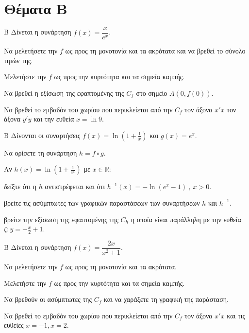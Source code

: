 \section{Θέματα Β}
\def\xrwma{secondcolor}
\begin{thema}{Β}
Δίνεται η συνάρτηση $f(x)=\dfrac{x}{e^x}$.
\begin{erwthma}
\item Να μελετήσετε την $f$ ως προς τη μονοτονία και τα ακρότατα και να βρεθεί το σύνολο τιμών της.
\item Μελετήστε την $f$ ως προς την κυρτότητα και τα σημεία καμπής.
\item Να βρεθεί η εξίσωση της εφαπτομένης της $C_f$ στο σημείο $A(0,f(0))$.
\item Να βρεθεί το εμβαδόν του χωρίου που περικλείεται από την $C_f$ τον άξονα $x'x$ τον άξονα $y'y$ και την ευθεία $x=\ln{9}$.
\end{erwthma}
\end{thema}
\begin{thema}{Β}
Δίνονται οι συναρτήσεις $f(x)=\ln{\left(1+\frac{1}{x}\right)}$ και $g(x)=e^x$.
\begin{erwthma}
\item Να ορίσετε τη συνάρτηση $h=f\circ g$.
\end{erwthma}
Αν $h(x)=\ln\left(1+\frac{1}{e^x}\right)$ με $x\in\mathbb{R}$:
\begin{erwthma}[resume]
\item δείξτε ότι η $h$ αντιστρέφεται και ότι $h^{-1}(x)=-\ln{\left(e^x-1\right)}\ ,\ x>0$.
\item βρείτε τις ασύμπτωτες των γραφικών παραστάσεων των συναρτήσεων $h$ και $h^{-1}$.
\item βρείτε την εξίσωση της εφαπτομένης της $C_h$ η οποία είναι παράλληλη με την ευθεία $\zeta: y=-\frac{x}{2}+1$.
\end{erwthma}
\end{thema}
\begin{thema}{Β}
Δίνεται η συνάρτηση $f(x)=\dfrac{2x}{x^2+1}$.
\begin{erwthma}
\item Να μελετήσετε την $f$ ως προς τη μονοτονία και τα ακρότατα.
\item Μελετήστε την $f$ ως προς την κυρτότητα και τα σημεία καμπής.
\item Να βρεθούν οι ασύμπτωτες της $C_f$ και να χαράξετε τη γραφική της παράσταση.
\item Να βρεθεί το εμβαδόν του χωρίου που περικλείεται από την $C_f$ τον άξονα $x'x$ και τις ευθείες $x=-1,x=2$.
\end{erwthma}
\end{thema}
